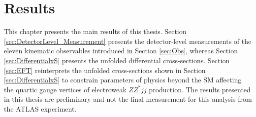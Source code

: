 \part{Results}
\label{sec:Results}

This chapter presents the main results of this thesis. Section \ref{sec:DetectorLevel_Measurement} presents the detector-level measurements of the eleven kinematic observables introduced in Section \ref{sec:Obs}, whereas Section \ref{sec:DifferentialxS} presents the unfolded differential cross-sections. Section \ref{sec:EFT} reinterprets the unfolded cross-sections shown in Section \ref{sec:DifferentialxS} to constrain parameters of physics beyond the SM affecting the quartic gauge vertices of electroweak $ZZ^*jj$ production. The results presented in this thesis are preliminary and not the final measurement for this analysis from the ATLAS experiment.




